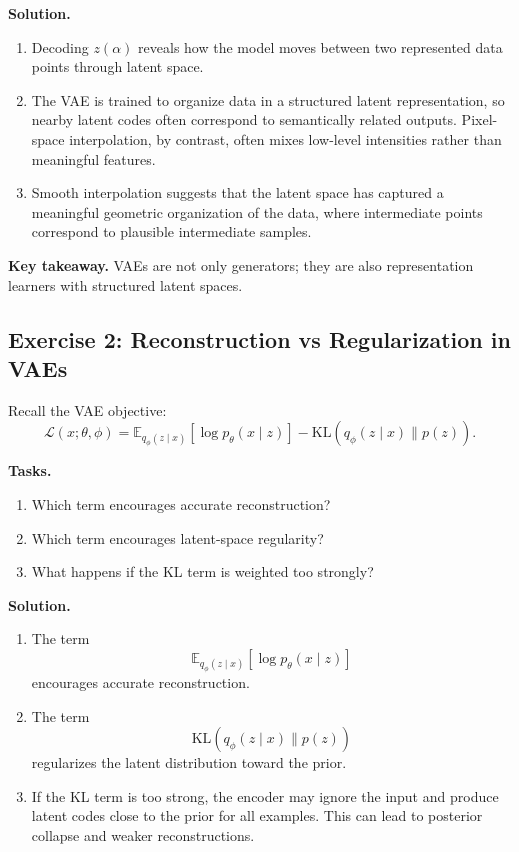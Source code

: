 \medskip

\noindent
\textbf{Solution.}
\begin{enumerate}
    \item Decoding \(z(\alpha)\) reveals how the model moves between two represented data points through latent space.

    \item The VAE is trained to organize data in a structured latent representation, so nearby latent codes often correspond to semantically related outputs. Pixel-space interpolation, by contrast, often mixes low-level intensities rather than meaningful features.

    \item Smooth interpolation suggests that the latent space has captured a meaningful geometric organization of the data, where intermediate points correspond to plausible intermediate samples.
\end{enumerate}

\medskip

\noindent
\textbf{Key takeaway.}  
VAEs are not only generators; they are also representation learners with structured latent spaces.

\subsection{Exercise 2: Reconstruction vs Regularization in VAEs}

Recall the VAE objective:
\[
\mathcal{L}(x;\theta,\phi)
=
\mathbb{E}_{q_\phi(z\mid x)}[\log p_\theta(x\mid z)]
-
\mathrm{KL}(q_\phi(z\mid x)\|p(z)).
\]

\medskip

\noindent
\textbf{Tasks.}
\begin{enumerate}
    \item Which term encourages accurate reconstruction?
    \item Which term encourages latent-space regularity?
    \item What happens if the KL term is weighted too strongly?
\end{enumerate}

\medskip

\noindent
\textbf{Solution.}
\begin{enumerate}
    \item The term
    \[
    \mathbb{E}_{q_\phi(z\mid x)}[\log p_\theta(x\mid z)]
    \]
    encourages accurate reconstruction.

    \item The term
    \[
    \mathrm{KL}(q_\phi(z\mid x)\|p(z))
    \]
    regularizes the latent distribution toward the prior.

    \item If the KL term is too strong, the encoder may ignore the input and produce latent codes close to the prior for all examples. This can lead to posterior collapse and weaker reconstructions.
\end{enumerate}

